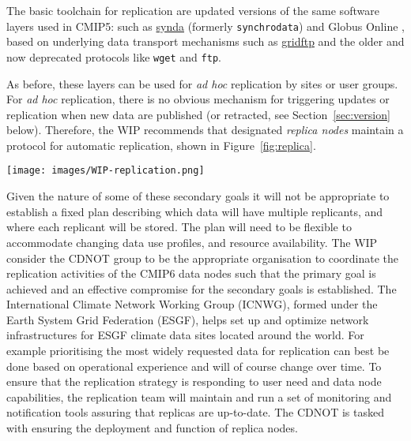 \documentclass[gmd,manuscript]{copernicus}
\newcommand{\pipref}[1] {\citep{ref:#1}}
\newcommand{\figref}[1] {\mbox{Figure   \ref{fig:#1}}}
\newcommand{\secref}[1] {\mbox{Section  \ref{sec:#1}}}
\begin{document}
The basic toolchain for replication are updated versions of the same
software layers used in CMIP5: such as
\href{https://github.com/Prodiguer/synda}{synda} (formerly
\texttt{synchrodata}) and Globus Online \pipref{allenetal2012}, based
on underlying data transport mechanisms such as
\href{https://goo.gl/Z8xcfE}{gridftp} and the older and now deprecated
protocols like \texttt{wget} and \texttt{ftp}.

As before, these layers can be used for \emph{ad hoc} replication by
sites or user groups. For \emph{ad hoc} replication, there is no
obvious mechanism for triggering updates or replication when new data
are published (or retracted, see \secref{version} below). Therefore,
the WIP recommends that designated \emph{replica nodes} maintain a
protocol for automatic replication, shown in \figref{replica}.


\begin{figure*}
  \begin{center}
    \texttt{[image: images/WIP-replication.png]}
  \end{center}
  \caption{CMIP6 replication from data nodes to replica centers and
    between replica centers coordinated by a CMIP6 replication team.}
  \label{fig:replica}
\end{figure*}

Given the nature of some of these secondary goals it will not be
appropriate to establish a fixed plan describing which data will have
multiple replicants, and where each replicant will be stored. The plan
will need to be flexible to accommodate changing data use profiles,
and resource availability. The WIP consider the CDNOT group to be the
appropriate organisation to coordinate the replication activities of
the CMIP6 data nodes such that the primary goal is achieved and an
effective compromise for the secondary goals is established. The
International Climate Network Working Group (ICNWG), formed under the
Earth System Grid Federation (ESGF), helps set up and optimize network
infrastructures for ESGF climate data sites located around the world.
For example prioritising the most widely requested data for
replication can best be done based on operational experience and will
of course change over time. To ensure that the replication strategy is
responding to user need and data node capabilities, the replication
team will maintain and run a set of monitoring and notification tools
assuring that replicas are up-to-date. The CDNOT is tasked with
ensuring the deployment and function of replica nodes.
\end{document}
